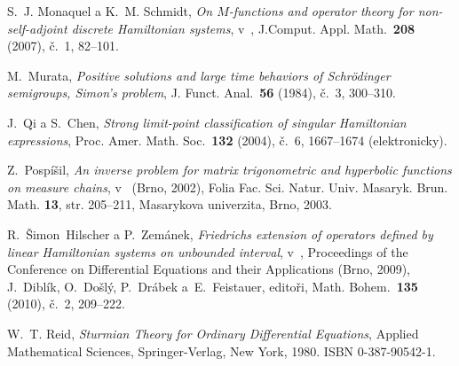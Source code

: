 \begin{thebibliography}{10}

S.~J. Monaquel a K.~M. Schmidt, \textit{On $M$-functions and operator
  theory for non-self-adjoint discrete Hamiltonian systems}, v~, J.Comput. Appl. 
  Math.~\textbf{208} (2007), \v{c}.~1, 82--101.

M.~Murata, \textit{Positive solutions and large time behaviors of
  Schrödinger semigroups, Simon's problem}, J. Funct. Anal.~\textbf{56}
  (1984), č.~3, 300--310.

J.~Qi a S.~Chen, \textit{Strong limit-point classification of singular
  Hamiltonian expressions}, Proc. Amer. Math. Soc.~\textbf{132} (2004),
  č.~6, 1667--1674 (elektronicky).

Z.~Pospíšil, \textit{An inverse problem for matrix trigonometric and
  hyperbolic functions on measure chains}, v~ (Brno, 2002), Folia Fac.
  Sci. Natur. Univ. Masaryk. Brun. Math. {\bf 13}, str. 205--211, Masarykova
  univerzita, Brno, 2003.

R.~Šimon~Hilscher a P.~Zemánek, \textit{Friedrichs extension of
  operators defined by linear Hamiltonian systems on unbounded interval}, 
  v~, Proceedings of the Conference on Differential Equations and
  their Applications (Brno, 2009), J.~Diblík, O.~Došlý, P.~Drábek 
  a~E.~Feistauer, editoři, Math. Bohem.~\textbf{135} (2010),
  č.~2, 209--222.

W.~T. Reid, \textit{Sturmian Theory for Ordinary Differential Equations}, Applied 
  Mathematical Sciences, Springer-Verlag, New York, 1980. 
  ISBN 0-387-90542-1.

\end{thebibliography}

\cleardoublepage
